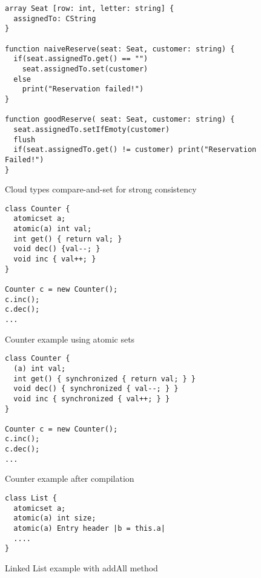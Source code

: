 \begin{figure}[tp]
\begin{lstlisting}
array Seat [row: int, letter: string] {
  assignedTo: CString
}

function naiveReserve(seat: Seat, customer: string) {
  if(seat.assignedTo.get() == "")
    seat.assignedTo.set(customer)
  else 
    print("Reservation failed!")
}

function goodReserve( seat: Seat, customer: string) {
  seat.assignedTo.setIfEmoty(customer)
  flush
  if(seat.assignedTo.get() != customer) print("Reservation Failed!")
}
\end{lstlisting}
\caption{Cloud types compare-and-set for strong consistency}
\label{lst:acCmpSet}
\end{figure}

\begin{figure}[tp]
\begin{lstlisting}
class Counter {
  atomicset a;
  atomic(a) int val;
  int get() { return val; }
  void dec() {val--; }
  void inc { val++; }
}

Counter c = new Counter();
c.inc();
c.dec();
...
\end{lstlisting}
\caption{Counter example using atomic sets}
\label{lst:acCounter}
\end{figure}



\begin{figure}[tp]
\begin{lstlisting}
class Counter {
  (a) int val;
  int get() { synchronized { return val; } }
  void dec() { synchronized { val--; } }
  void inc { synchronized { val++; } }
}

Counter c = new Counter();
c.inc();
c.dec();
...
\end{lstlisting}
\caption{Counter example after compilation}
\label{lst:acCounterCompiled}
\end{figure}


\begin{figure}[tp]
\begin{lstlisting}
class List {
  atomicset a;
  atomic(a) int size;
  atomic(a) Entry header |b = this.a|
  ....
}
\end{lstlisting}
\caption{Linked List example with addAll method}
\label{lst:acList}
\end{figure}




































